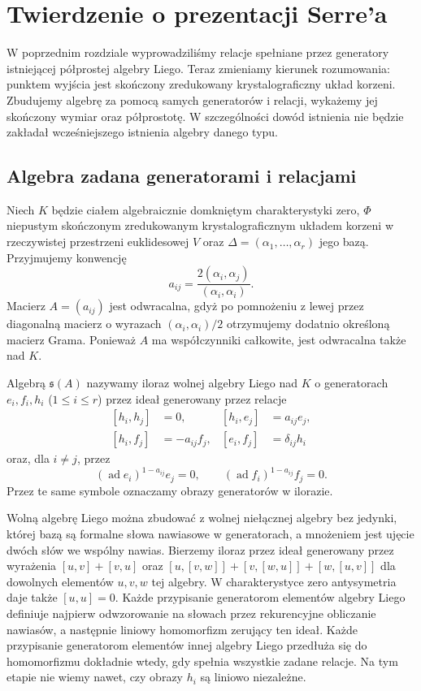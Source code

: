 \chapter[Prezentacja Serre'a]{Twierdzenie o prezentacji Serre'a}
\label{aa:ch:serre-presentation}

W poprzednim rozdziale wyprowadziliśmy relacje spełniane przez generatory istniejącej półprostej algebry Liego. Teraz zmieniamy kierunek rozumowania: punktem wyjścia jest skończony zredukowany krystalograficzny układ korzeni. Zbudujemy algebrę za pomocą samych generatorów i relacji, wykażemy jej skończony wymiar oraz półprostotę. W szczególności dowód istnienia nie będzie zakładał wcześniejszego istnienia algebry danego typu.

\section{Algebra zadana generatorami i relacjami}

Niech $K$ będzie ciałem algebraicznie domkniętym charakterystyki zero, $\Phi$ niepustym skończonym zredukowanym krystalograficznym układem korzeni w rzeczywistej przestrzeni euklidesowej $V$ oraz $\Delta=(\alpha_1,\ldots,\alpha_r)$ jego bazą. Przyjmujemy konwencję
\[
 a_{ij}=\frac{2(\alpha_i,\alpha_j)}{(\alpha_i,\alpha_i)}.
\]
Macierz $A=(a_{ij})$ jest odwracalna, gdyż po pomnożeniu z lewej przez diagonalną macierz o wyrazach $(\alpha_i,\alpha_i)/2$ otrzymujemy dodatnio określoną macierz Grama. Ponieważ $A$ ma współczynniki całkowite, jest odwracalna także nad $K$.

\begin{definicja}
\label{aa:def:serre-algebra}
Algebrą $\mathfrak s(A)$ nazywamy iloraz wolnej algebry Liego nad $K$ o generatorach $e_i,f_i,h_i$ ($1\le i\le r$) przez ideał generowany przez relacje
\[
\begin{aligned}
 [h_i,h_j]&=0,&[h_i,e_j]&=a_{ij}e_j,\\
 [h_i,f_j]&=-a_{ij}f_j,&[e_i,f_j]&=\delta_{ij}h_i
\end{aligned}
\]
oraz, dla $i\ne j$, przez
\[
 (\operatorname{ad}e_i)^{1-a_{ij}}e_j=0,\qquad
 (\operatorname{ad}f_i)^{1-a_{ij}}f_j=0.
\]
Przez te same symbole oznaczamy obrazy generatorów w ilorazie.
\end{definicja}

Wolną algebrę Liego można zbudować z wolnej niełącznej algebry bez jedynki, której bazą są formalne słowa nawiasowe w generatorach, a mnożeniem jest ujęcie dwóch słów we wspólny nawias. Bierzemy iloraz przez ideał generowany przez wyrażenia $[u,v]+[v,u]$ oraz $[u,[v,w]]+[v,[w,u]]+[w,[u,v]]$ dla dowolnych elementów $u,v,w$ tej algebry. W charakterystyce zero antysymetria daje także $[u,u]=0$. Każde przypisanie generatorom elementów algebry Liego definiuje najpierw odwzorowanie na słowach przez rekurencyjne obliczanie nawiasów, a następnie liniowy homomorfizm zerujący ten ideał. Każde przypisanie generatorom elementów innej algebry Liego przedłuża się do homomorfizmu dokładnie wtedy, gdy spełnia wszystkie zadane relacje. Na tym etapie nie wiemy nawet, czy obrazy $h_i$ są liniowo niezależne.

